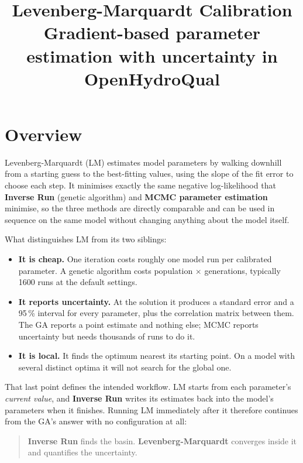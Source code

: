 \documentclass[11pt,a4paper]{article}
\title{\textbf{Levenberg-Marquardt Calibration}\\[0.3em]
       \large Gradient-based parameter estimation with uncertainty in OpenHydroQual}
\author{}
\date{}
\begin{document}
\maketitle
\tableofcontents

\section{Overview}

Levenberg-Marquardt (LM) estimates model parameters by walking downhill from a
starting guess to the best-fitting values, using the slope of the fit error to
choose each step. It minimises exactly the same negative log-likelihood that
\textbf{Inverse Run} (genetic algorithm) and \textbf{MCMC parameter estimation}
minimise, so the three methods are directly comparable and can be used in sequence on the
same model without changing anything about the model itself.

What distinguishes LM from its two siblings:

\begin{itemize}[leftmargin=1.4em]
  \item \textbf{It is cheap.} One iteration costs roughly one model run per
        calibrated parameter. A genetic algorithm costs population $\times$
        generations, typically 1600 runs at the default settings.
  \item \textbf{It reports uncertainty.} At the solution it produces a standard
        error and a 95\,\% interval for every parameter, plus the correlation
        matrix between them. The GA reports a point estimate and nothing else;
        MCMC reports uncertainty but needs thousands of runs to do it.
  \item \textbf{It is local.} It finds the optimum nearest its starting point.
        On a model with several distinct optima it will not search for the
        global one.
\end{itemize}

That last point defines the intended workflow. LM starts from each parameter's
\emph{current value}, and \textbf{Inverse Run} writes its estimates back into
the model's parameters when it finishes. Running LM immediately after it
therefore continues from the GA's answer with no configuration at all:

\begin{quote}
\textbf{Inverse Run} finds the basin. \textbf{Levenberg-Marquardt} converges
inside it and quantifies the uncertainty.
\end{quote}
\end{document}

